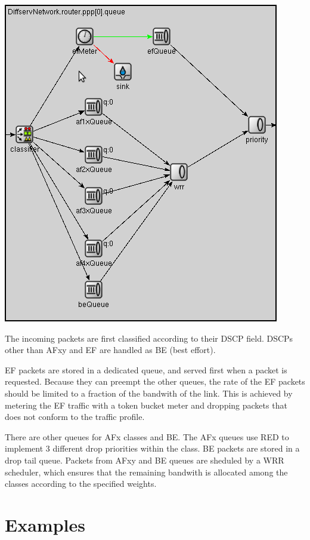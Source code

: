\begin{center}
\includegraphics[scale=0.7]{figures/DiffservQueue.png}
\end{center}

The incoming packets are first classified according to
their DSCP field. DSCPs other than AFxy and EF are handled
as BE (best effort).

EF packets are stored in a dedicated queue, and served first
when a packet is requested. Because they can preempt the other
queues, the rate of the EF packets should be limited to a fraction
of the bandwith of the link. This is achieved by metering the EF
traffic with a token bucket meter and dropping packets that
does not conform to the traffic profile.

There are other queues for AFx classes and BE. The AFx queues
use RED to implement 3 different drop priorities within the class.
BE packets are stored in a drop tail queue.
Packets from AFxy and BE queues are sheduled by a WRR scheduler,
which ensures that the remaining bandwith is allocated among the classes
according to the specified weights.

\section{Examples}

